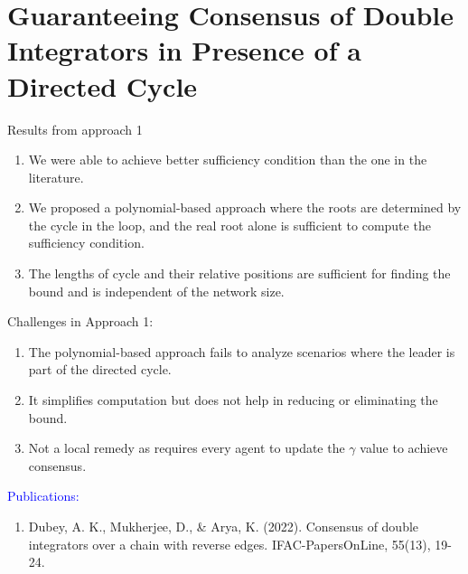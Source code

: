 \section{\color{blue}Guaranteeing Consensus of Double Integrators in Presence of a Directed Cycle}\label{Conc:Approach1}
\begin{frame}
	\begin{block}{Results from approach 1}
		\begin{enumerate}
			\item We were able to achieve better sufficiency condition than the one in the literature.\hyperlink{BetterSuff}{}
			\item We proposed a polynomial-based approach where the roots are determined by the cycle in the loop, and the real root alone is sufficient to compute the sufficiency condition.
			\item The lengths of cycle and their relative positions are sufficient for finding the bound and is independent of the network size. 
		\end{enumerate}
	\end{block}
	\begin{block}{Challenges in Approach 1:}
		\begin{enumerate}
			\item The polynomial-based approach fails to analyze scenarios where the leader is part of the directed cycle.
			\item It simplifies computation but does not help in reducing or eliminating the bound.
			\item Not a local remedy as requires every agent to update the $\gamma$ value to achieve consensus.
		\end{enumerate}
	\end{block}
	\textcolor{blue}{Publications: }\\
	\begin{enumerate}
		\item Dubey, A. K., Mukherjee, D., \& Arya, K. (2022). Consensus of double integrators over a chain with reverse edges. IFAC-PapersOnLine, 55(13), 19-24.
	\end{enumerate}
	\vspace{0.2cm}
\end{frame}

